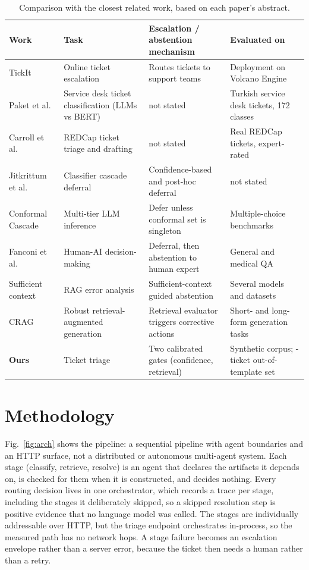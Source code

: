 \documentclass[conference,a4paper]{IEEEtran}
\newcommand{\paketclasses}{172}
\begin{document}
\begin{table}[t]
\centering\footnotesize
\caption{Comparison with the closest related work, based on each paper's abstract.}
\label{tab:related}
\begin{tabularx}{\textwidth}{lYYY}
\toprule
Work & Task & Escalation / abstention mechanism & Evaluated on \\
\midrule
TickIt~\cite{tickit} & Online ticket escalation & Routes tickets to support teams & Deployment on Volcano Engine \\
Paket et al.~\cite{paket_ticket} & Service desk ticket classification (LLMs vs BERT) & not stated & Turkish service desk tickets, \paketclasses{} classes \\
Carroll et al.~\cite{redcap_llm_triage} & REDCap ticket triage and drafting & not stated & Real REDCap tickets, expert-rated \\
Jitkrittum et al.~\cite{jitkrittum_cascade} & Classifier cascade deferral & Confidence-based and post-hoc deferral & not stated \\
Conformal Cascade~\cite{conformal_cascade} & Multi-tier LLM inference & Defer unless conformal set is singleton & Multiple-choice benchmarks \\
Fanconi et al.~\cite{fanconi_defer} & Human-AI decision-making & Deferral, then abstention to human expert & General and medical QA \\
Sufficient context~\cite{joren_sufficient} & RAG error analysis & Sufficient-context guided abstention & Several models and datasets \\
CRAG~\cite{crag} & Robust retrieval-augmented generation & Retrieval evaluator triggers corrective actions & Short- and long-form generation tasks \\
\midrule
\textbf{Ours} & Ticket triage & Two calibrated gates (confidence, retrieval) & Synthetic corpus; -ticket out-of-template set \\
\bottomrule
\end{tabularx}
\end{table}

\section{Methodology}
\label{sec:method}
Fig.~\ref{fig:arch} shows the pipeline: a sequential pipeline with agent boundaries and an HTTP surface, not a distributed or autonomous multi-agent system. Each stage (classify, retrieve, resolve) is an agent that declares the artifacts it depends on, is checked for them when it is constructed, and decides nothing. Every routing decision lives in one orchestrator, which records a trace per stage, including the stages it deliberately skipped, so a skipped resolution step is positive evidence that no language model was called. The stages are individually addressable over HTTP, but the triage endpoint orchestrates in-process, so the measured path has no network hops. A stage failure becomes an escalation envelope rather than a server error, because the ticket then needs a human rather than a retry.
\end{document}

